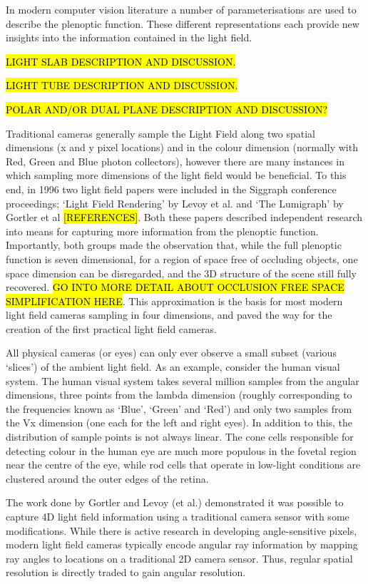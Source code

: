In modern computer vision literature a number of parameterisations are used to describe the plenoptic function.
These different representations each provide new insights into the information contained in the light field.

\hl{LIGHT SLAB DESCRIPTION AND DISCUSSION.}

\hl{LIGHT TUBE DESCRIPTION AND DISCUSSION.}

\hl{POLAR AND/OR DUAL PLANE DESCRIPTION AND DISCUSSION?}


Traditional cameras generally sample the Light Field along two spatial dimensions (x and y pixel locations) and in the colour dimension (normally with Red, Green and Blue photon collectors), however there are many instances in which sampling more dimensions of the light field would be beneficial. To this end, in 1996 two light field papers were included in the Siggraph conference proceedings; ‘Light Field Rendering’ by Levoy et al. and ‘The Lumigraph’ by Gortler et al \hl{[REFERENCES]}. Both these papers described independent research into means for capturing more information from the plenoptic function. Importantly, both groups made the observation that, while the full plenoptic function is seven dimensional, for a region of space free of occluding objects, one space dimension can be disregarded, and the 3D structure of the scene still fully recovered. \hl{GO INTO MORE DETAIL ABOUT OCCLUSION FREE SPACE SIMPLIFICATION HERE}. This approximation is the basis for most modern light field cameras sampling in four dimensions, and paved the way for the creation of the first practical light field cameras.

All physical cameras (or eyes) can only ever observe a small subset (various ‘slices’) of the ambient light field. As an example, consider the human visual system. The human visual system takes several million samples from the angular dimensions, three points from the lambda dimension (roughly corresponding to the frequencies known as ‘Blue’, ‘Green’ and ‘Red’) and only two samples from the Vx dimension (one each for the left and right eyes). In addition to this, the distribution of sample points is not always linear. The cone cells responsible for detecting colour in the human eye are much more populous in the fovetal region near the centre of the eye, while rod cells that operate in low-light conditions are clustered around the outer edges of the retina.

The work done by Gortler and Levoy (et al.) demonstrated it was possible to capture 4D light field information using a traditional camera sensor with some modifications. While there is active research in developing angle-sensitive pixels, modern light field cameras typically encode angular ray information by mapping ray angles to locations on a traditional 2D camera sensor. Thus, regular spatial resolution is directly traded to gain angular resolution.

